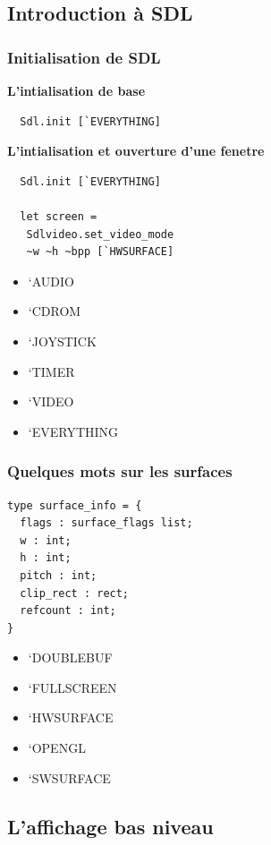 \subsection{Introduction à SDL} %

\begin{frame}[fragile]
	\frametitle{Initialisation de SDL}
	\begin{minipage}{0.55\textwidth}
		\textbf{L'intialisation de base}
		\lstset{basicstyle=\small}
		\begin{lstlisting}
  Sdl.init [`EVERYTHING] 
		\end{lstlisting}
		\textbf{L'intialisation et ouverture d'une fenetre}
		\lstset{basicstyle=\small}
		\begin{lstlisting}
  Sdl.init [`EVERYTHING]

  let screen = 
   Sdlvideo.set_video_mode 
   ~w ~h ~bpp [`HWSURFACE]
		\end{lstlisting}
	\end{minipage}
	\begin{minipage}{0.4\textwidth}
		\begin{itemize}
			\item `AUDIO
			\item `CDROM
			\item `JOYSTICK
			\item `TIMER
			\item `VIDEO
		\end{itemize}
		\begin{itemize}
			\item `EVERYTHING
		\end{itemize}
	\end{minipage}
\end{frame}

\begin{frame}[fragile]
	\frametitle{Quelques mots sur les surfaces}
	\begin{minipage}{0.55\textwidth}
		\lstset{basicstyle=\small}
		\begin{lstlisting}
type surface_info = {
  flags : surface_flags list;
  w : int;
  h : int;
  pitch : int;
  clip_rect : rect;
  refcount : int;
}
		\end{lstlisting}
	\end{minipage}
	\begin{minipage}{0.4\textwidth}
		\begin{itemize}
			\item `DOUBLEBUF
			\item `FULLSCREEN
			\item `HWSURFACE
			\item `OPENGL
			\item `SWSURFACE
		\end{itemize}
	\end{minipage}
\end{frame}

\subsection{L'affichage bas niveau} %
